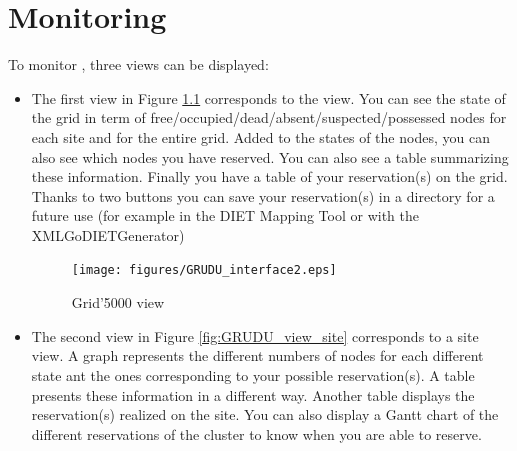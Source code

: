 \chapter{Monitoring \gfk}
To monitor \gfk, three views can be displayed:
\begin{itemize}
  \item The first view in Figure \ref{fig:GRUDU_view_g5k} corresponds to the
  \gfk view. You can see the state of the grid in term of
  free/occupied/dead/absent/suspected/possessed nodes for each site and for
  the entire grid.
  Added to the states of the nodes, you can also see which nodes you have reserved.
  You can also see a table summarizing these information. Finally you have a
  table of your reservation(s) on the grid. Thanks to two buttons you can save your
  reservation(s) in a directory for a future use (for example in the DIET Mapping
  Tool or with the XMLGoDIETGenerator)
  \begin{figure}[H]
	\centering
	\texttt{[image: figures/GRUDU\_interface2.eps]}
	\caption{Grid'5000 view}
	\label{fig:GRUDU_view_g5k}
  \end{figure}
  \item The second view in Figure \ref{fig:GRUDU_view_site} corresponds to a
  site view. A graph represents the different numbers of nodes for each different
  state ant the ones corresponding to your possible reservation(s). A table 
  presents these information in a different way. Another table displays the 
  reservation(s) realized on the site. You can also display a Gantt chart of the 
  different reservations of the cluster to know when you are able to reserve.
  

\end{itemize}
